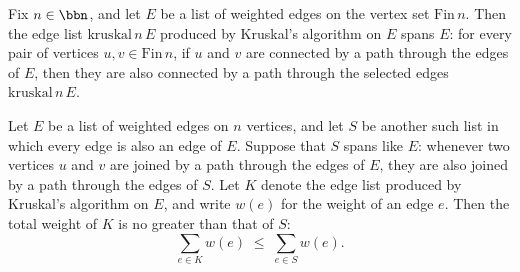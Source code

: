\begin{theorem}
\label{Kruskal.kruskal_spans}
\leanok
{}
Fix $n \in \bbn$, and let $E$ be a list of weighted edges on the vertex set
$\mathrm{Fin}\,n$. Then the edge list $\mathrm{kruskal}\,n\,E$ produced by Kruskal's
algorithm on $E$ spans $E$: for every pair of vertices $u, v \in \mathrm{Fin}\,n$, if
$u$ and $v$ are connected by a path through the edges of $E$, then they are also
connected by a path through the selected edges $\mathrm{kruskal}\,n\,E$.
\end{theorem}

\begin{theorem}
\label{Kruskal.kruskal_optimal}
\leanok
{}
Let $E$ be a list of weighted edges on $n$ vertices, and let $S$ be another such list in
which every edge is also an edge of $E$. Suppose that $S$ spans like $E$: whenever two
vertices $u$ and $v$ are joined by a path through the edges of $E$, they are also joined
by a path through the edges of $S$. Let $K$ denote the edge list produced by Kruskal's
algorithm on $E$, and write $w(e)$ for the weight of an edge $e$. Then the total weight
of $K$ is no greater than that of $S$:
\[
  \sum_{e \in K} w(e) \;\le\; \sum_{e \in S} w(e).
\]
\end{theorem}

